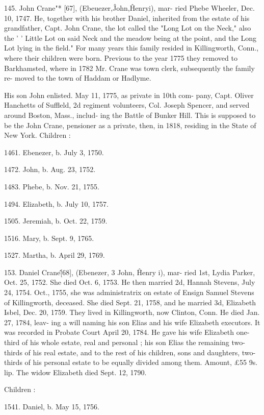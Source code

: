 \documentclass{book}
\begin{document}
145. John Crane"* [67], (Ebeuezer,\^ John,\^ Henryi), mar- 
ried Phebe Wheeler, Dec. 10, 1747. He, together with his brother 
Daniel, inherited from the estate of his grandfather, Capt. John 
Crane, the lot called the "Long Lot on the Neck," also the 
' ' Little Lot on said Neck and the meadow being at the point, and 
the Long Lot lying in the field." For many years this family 
resided in Killingworth, Conn., where their children were born. 
Previous to the year 1775 they removed to Barkhamsted, where 
in 1782 Mr. Crane was town clerk, subsequently the family re- 
moved to the town of Haddam or Hadlyme. 

His son John enlisted. May 11, 1775, as private in 10th com- 
pany, Capt. Oliver Hanchetts of Suffleld, 2d regiment volunteers, 
Col. Joseph Spencer, and served around Boston, Mass., includ- 
ing the Battle of Bunker Hill. This is supposed to be the John 
Crane, pensioner as a private, then, in 1818, residing in the State 
of New York. Children : 

1461. Ebenezer, b. July 3, 1750. 

1472. John, b. Aug. 23, 1752. 

1483. Phebe, b. Nov. 21, 1755. 

1494. Elizabeth, b. July 10, 1757. 

1505. Jeremiah, b. Oct. 22, 1759. 

1516. Mary, b. Sept. 9, 1765. 

1527. Martha, b. April 29, 1769. 

153. Daniel Crane\^ [68], (Ebenezer, 3 John, \^ Henry i), mar- 
ried 1st, Lydia Parker, Oct. 25, 1752. She died Oct. 6, 1753. 
He then married 2d, Hannah Stevens, July 24, 1754. Oct., 
1755, she was administratrix on estate of Ensign Samuel Stevens 
of Killingworth, deceased. She died Sept. 21, 1758, and he 
married 3d, Elizabeth Isbel, Dec. 20, 1759. They lived in 
Killingworth, now Clinton, Conn. He died Jan. 27, 1784, leav- 
ing a will naming his son Elias and his wife Elizabeth executors. 
It was recorded in Probate Court April 20, 1784. He gave his 
wife Elizabeth one-third of his whole estate, real and personal ; 
his son Elias the remaining two-thirds of his real estate, and to 
the rest of his children, sons and daughters, two-thirds of his 
personal estate to be equally divided among them. Amount, 
£55 9s. lip. The widow Elizabeth died Sept. 12, 1790. 

Children : 

1541. Daniel, b. May 15, 1756. 
\end{document}
